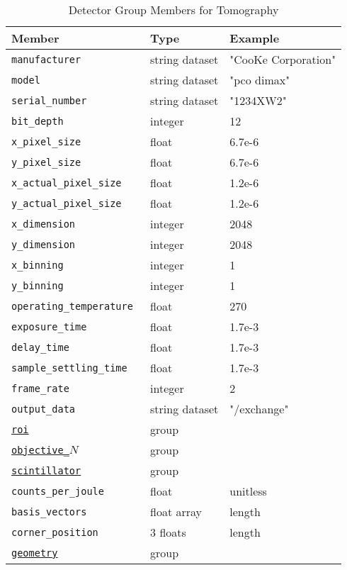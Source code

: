 \begin{table}[h!]\sffamily \footnotesize
\caption{Detector Group Members for Tomography}
\centering
{}
\begin{tabular}{l l l}
\toprule
\bfseries Member     & \bfseries Type & \bfseries Example \\
\midrule
\tt{manufacturer} & string dataset & "CooKe Corporation" \\   
\tt{model} & string dataset &  "pco dimax" \\
\tt{serial\_number} & string dataset &  "1234XW2" \\  
\tt{bit\_depth} & integer & 12 \\     
\tt{x\_pixel\_size} & float & 6.7e-6 \\
\tt{y\_pixel\_size} & float & 6.7e-6 \\
\tt{x\_actual\_pixel\_size} & float & 1.2e-6 \\
\tt{y\_actual\_pixel\_size} & float & 1.2e-6 \\
\tt{x\_dimension} & integer & 2048 \\
\tt{y\_dimension} & integer & 2048 \\
\tt{x\_binning} & integer & 1 \\
\tt{y\_binning} & integer & 1 \\
\tt{operating\_temperature} & float &  270 \\     
\tt{exposure\_time} & float & 1.7e-3 \\   
\tt{delay\_time} & float & 1.7e-3 \\   
\tt{sample\_settling\_time} & float & 1.7e-3 \\   
\tt{frame\_rate} & integer &  2 \\
\tt{output\_data} & string dataset & "/exchange" \\
\hyperref[table:roi]{\tt{roi}} & group & \\
\hyperref[table:objective]{\tt{objective\_$N$}} & group & \\
\hyperref[table:scintillator]{\tt{scintillator}} & group &\\
\tt{counts\_per\_joule} & float & unitless \\ 
\tt{basis\_vectors} & float array & length \\ 
\tt{corner\_position} & 3 floats & length \\
\hyperref[tomo:geometry]{\tt{geometry}} & group & \\
\bottomrule
\end{tabular}
\end{table}

